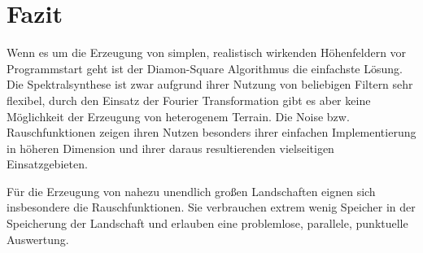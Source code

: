 \chapter{Fazit}
Wenn es um die Erzeugung von simplen, realistisch wirkenden Höhenfeldern vor Programmstart geht ist der Diamon-Square Algorithmus die einfachste Lösung. Die Spektralsynthese ist zwar aufgrund ihrer Nutzung von beliebigen Filtern sehr flexibel, durch den Einsatz der Fourier Transformation gibt es aber keine Möglichkeit der Erzeugung von heterogenem Terrain. Die Noise bzw. Rauschfunktionen zeigen ihren Nutzen besonders ihrer einfachen Implementierung in höheren Dimension und ihrer daraus resultierenden vielseitigen Einsatzgebieten.

Für die Erzeugung von nahezu unendlich großen Landschaften eignen sich insbesondere die Rauschfunktionen. Sie verbrauchen extrem wenig Speicher in der Speicherung der Landschaft und erlauben eine problemlose, parallele, punktuelle Auswertung. 